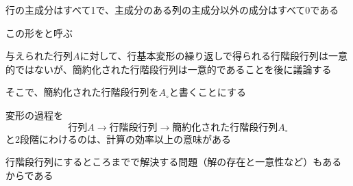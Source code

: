 \documentclass[../../../topic_linear-algebra]{subfiles}
\begin{document}
行の主成分はすべて1で、主成分のある列の主成分以外の成分はすべて0である

この形をと呼ぶ

\br

与えられた行列$A$に対して、行基本変形の繰り返しで得られる行階段行列は一意的ではないが、簡約化された行階段行列は一意的であることを後に議論する

そこで、簡約化された行階段行列を$A_\circ$と書くことにする

\sectionline

変形の過程を
\begin{equation*}
  \text{行列}A \rightarrow \text{行階段行列} \rightarrow \text{簡約化された行階段行列}A_\circ
\end{equation*}
と2段階にわけるのは、計算の効率以上の意味がある

行階段行列にするところまでで解決する問題（解の存在と一意性など）もあるからである
\end{document}
